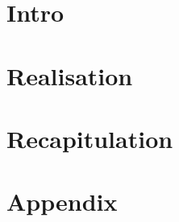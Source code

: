 


	
	
	
	
	\renewcommand{\contentsname}{Table of Content}
	\tableofcontents
	\newpage
	
	\part{Intro}
	
	
	
	\part{Realisation}
	
	
	
	\part{Recapitulation}
	
	
	

	\part{Appendix}
	\appendix
	
	
